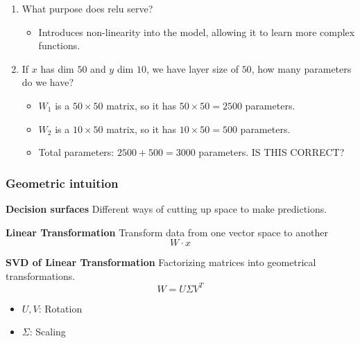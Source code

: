 \documentclass{article}
\begin{document}
\begin{example}
    \begin{enumerate}
        \item What purpose does relu serve? 
            \begin{itemize}
                \item Introduces non-linearity into the model, allowing it to learn more complex functions.
            \end{itemize}       
        \item If $x$ has dim $50$ and $y$ dim $10$, we have layer size of $50$, how many parameters do we have?
            \begin{itemize}
                \item $W_1$ is a $50 \times 50$ matrix, so it has $50 \times 50 = 2500$ parameters.
                \item $W_2$ is a $10 \times 50$ matrix, so it has $10 \times 50 = 500$ parameters.
                \item Total parameters: $2500 + 500 = 3000$ parameters. IS THIS CORRECT?
            \end{itemize} 
    \end{enumerate}
\end{example}

\subsubsection{Geometric intuition}
\begin{notes} \textbf{Decision surfaces}
    Different ways of cutting up space to make predictions.
\end{notes}

\begin{notes} \textbf{Linear Transformation}
    Transform data from one vector space to another
    \begin{equation}
        W \cdot x 
    \end{equation}
\end{notes}

\begin{notes} \textbf{SVD of Linear Transformation} 
    Factorizing matrices into geometrical transformations.
    \begin{equation}
        W = U \Sigma V^T
    \end{equation}
    \begin{itemize}
        \item $U,V$: Rotation
        \item $\Sigma$: Scaling
    \end{itemize}
\end{notes}
\end{document}
